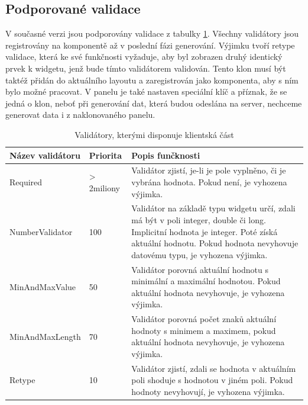 \subsection{Podporované validace}
V současné verzi jsou podporovány validace z tabulky \ref{table:validations}. Všechny validátory jsou registrovány na komponentě až v poslední fázi generování. Výjimku tvoří retype validace, která ke své funkčnosti vyžaduje, aby byl zobrazen druhý identický prvek k widgetu, jenž bude tímto validátorem validován. Tento klon musí být taktéž přidán do aktuálního layoutu a zaregistrován jako komponenta, aby s ním bylo možné pracovat. V panelu je také nastaven speciální klíč a příznak, že se jedná o klon, neboť při generování dat, která budou odeslána na server, nechceme generovat data i z naklonovaného panelu.
\begin{table}[width=\linewidth]
\begin{center}
\caption{Validátory, kterými disponuje klientská část}
\label{table:validations}
\begin{tabular}{|p{4cm}|p{2cm}|p{8cm}|}
\hline
\textbf{Název validátoru} & \textbf{Priorita} & \textbf{Popis funčknosti} \\
\hline
Required & > 2miliony & 
Validátor zjistí, je-li je pole vyplněno, či je vybrána hodnota. Pokud není, je vyhozena výjimka. \\
\hline
NumberValidator & 100 &
Validátor na základě typu widgetu určí, zdali má být v poli integer, double či long. Implicitní hodnota je integer. Poté získá aktuální hodnotu. Pokud hodnota nevyhovuje datovému typu, je vyhozena výjimka. \\
\hline
MinAndMaxValue & 50 &
Validátor porovná aktuální hodnotu s minimální a maximální hodnotou. Pokud aktuální hodnota nevyhovuje, je vyhozena výjimka. \\
\hline
MinAndMaxLength & 70 &
Validátor porovná počet znaků aktuální hodnoty s minimem a maximem, pokud aktuální hodnota nevyhovuje, je vyhozena výjimka. \\
\hline
Retype & 10 &
Validátor zjistí, zdali se hodnota v aktuálním poli shoduje s hodnotou v jiném poli. Pokud hodnoty nevyhovují, je vyhozena výjimka. \\
\hline
\end{tabular}
\end{center}
\end{table}

